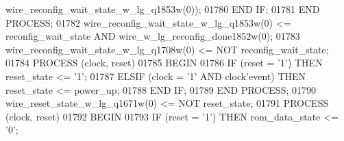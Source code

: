 \begin{DoxyCode}
{{      wire_reconfig_wait_state_w_lg_q1853w}\textcolor{vhdlchar}{(}\textcolor{vhdllogic}{}\textcolor{vhdllogic}{0}\textcolor{vhdlchar}{)}\textcolor{vhdlchar}{)};
01780         \textcolor{keywordflow}{END} \textcolor{keywordflow}{IF};
01781     \textcolor{keywordflow}{END} \textcolor{keywordflow}{PROCESS};
01782     \textcolor{vhdlchar}{wire_reconfig_wait_state_w_lg_q1853w}\textcolor{vhdlchar}{(}\textcolor{vhdllogic}{}\textcolor{vhdllogic}{0}\textcolor{vhdlchar}{)} \textcolor{vhdlchar}{<=} \textcolor{vhdlchar}{reconfig_wait_state} \textcolor{keywordflow}{AND} \textcolor{vhdlchar}{
      wire_w_lg_reconfig_done1852w}\textcolor{vhdlchar}{(}\textcolor{vhdllogic}{}\textcolor{vhdllogic}{0}\textcolor{vhdlchar}{)};
01783     \textcolor{vhdlchar}{wire_reconfig_wait_state_w_lg_q1708w}\textcolor{vhdlchar}{(}\textcolor{vhdllogic}{}\textcolor{vhdllogic}{0}\textcolor{vhdlchar}{)} \textcolor{vhdlchar}{<=} \textcolor{keywordflow}{NOT} \textcolor{vhdlchar}{reconfig_wait_state};
01784     \textcolor{keywordflow}{PROCESS} (clock, reset)
01785 \textcolor{vhdlkeyword}{    BEGIN}
01786         \textcolor{keywordflow}{IF} \textcolor{vhdlchar}{(}\textcolor{vhdlchar}{reset} \textcolor{vhdlchar}{=} \textcolor{vhdlchar}{'}\textcolor{vhdllogic}{}\textcolor{vhdllogic}{1}\textcolor{vhdlchar}{'}\textcolor{vhdlchar}{)} \textcolor{keywordflow}{THEN} \textcolor{vhdlchar}{reset_state} \textcolor{vhdlchar}{<=} \textcolor{vhdlchar}{'}\textcolor{vhdllogic}{}\textcolor{vhdllogic}{1}\textcolor{vhdlchar}{'};
01787         \textcolor{keywordflow}{ELSIF} \textcolor{vhdlchar}{(}\textcolor{vhdlchar}{clock} \textcolor{vhdlchar}{=} \textcolor{vhdlchar}{'}\textcolor{vhdllogic}{}\textcolor{vhdllogic}{1}\textcolor{vhdlchar}{'} \textcolor{keywordflow}{AND} \textcolor{vhdlchar}{clock}\textcolor{vhdlchar}{'}\textcolor{vhdlkeyword}{event}\textcolor{vhdlchar}{)} \textcolor{keywordflow}{THEN} \textcolor{vhdlchar}{reset_state} \textcolor{vhdlchar}{<=} \textcolor{vhdlchar}{power_up};
01788         \textcolor{keywordflow}{END} \textcolor{keywordflow}{IF};
01789     \textcolor{keywordflow}{END} \textcolor{keywordflow}{PROCESS};
01790     \textcolor{vhdlchar}{wire_reset_state_w_lg_q1671w}\textcolor{vhdlchar}{(}\textcolor{vhdllogic}{}\textcolor{vhdllogic}{0}\textcolor{vhdlchar}{)} \textcolor{vhdlchar}{<=} \textcolor{keywordflow}{NOT} \textcolor{vhdlchar}{reset_state};
01791     \textcolor{keywordflow}{PROCESS} (clock, reset)
01792 \textcolor{vhdlkeyword}{    BEGIN}
01793         \textcolor{keywordflow}{IF} \textcolor{vhdlchar}{(}\textcolor{vhdlchar}{reset} \textcolor{vhdlchar}{=} \textcolor{vhdlchar}{'}\textcolor{vhdllogic}{}\textcolor{vhdllogic}{1}\textcolor{vhdlchar}{'}\textcolor{vhdlchar}{)} \textcolor{keywordflow}{THEN} \textcolor{vhdlchar}{rom_data_state} \textcolor{vhdlchar}{<=} \textcolor{vhdlchar}{'}\textcolor{vhdllogic}{}\textcolor{vhdllogic}{0}\textcolor{vhdlchar}{'};
}
\end{DoxyCode}
